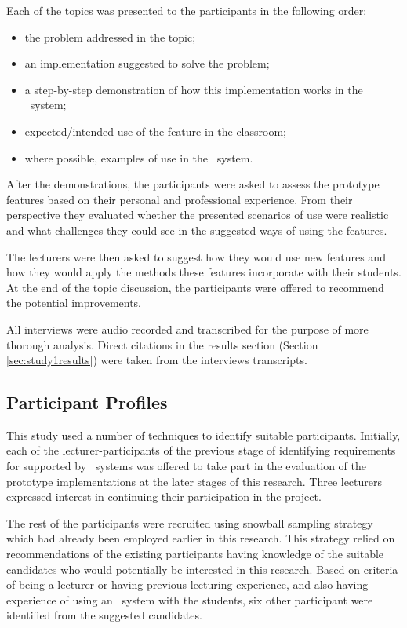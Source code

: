 Each of the topics was presented to the participants in the following order:

\begin{itemize}
  \item the problem addressed in the topic;
  \item an implementation suggested to solve the problem;
  \item a step-by-step demonstration of how this implementation works in the
  \ep~system;
  \item expected/intended use of the feature in the classroom;
  \item where possible, examples of use in the \ep~system.
\end{itemize}

After the demonstrations, the participants were asked to assess the prototype
features based on their personal and professional experience. From their
perspective they evaluated whether the presented scenarios of use were realistic
and what challenges they could see in the suggested ways of using the features.

The lecturers were then asked to suggest how they would use new features and how
they would apply the methods these features incorporate with their students. At
the end of the topic discussion, the participants were offered to recommend the
potential improvements.

All interviews were audio recorded and transcribed for the purpose of more
thorough analysis. Direct citations in the results section (Section
\ref{sec:study1results}) were taken from the interviews transcripts.

\subsection{Participant Profiles}

This study used a number of techniques to identify suitable participants.
Initially, each of the lecturer-participants of the previous stage of
identifying requirements for \LLLs supported by \ep~systems was offered to take
part in the evaluation of the prototype implementations at the later stages of
this research. Three lecturers expressed interest in continuing their
participation in the project.

The rest of the participants were recruited using snowball sampling strategy
which had already been employed earlier in this research. This strategy relied on
recommendations of the existing participants having knowledge of the suitable
candidates who would potentially be interested in this research. Based on
criteria of being a lecturer or having previous lecturing experience, and
also having experience of using an \ep~system with the students, six other
participant were identified from the suggested candidates.

